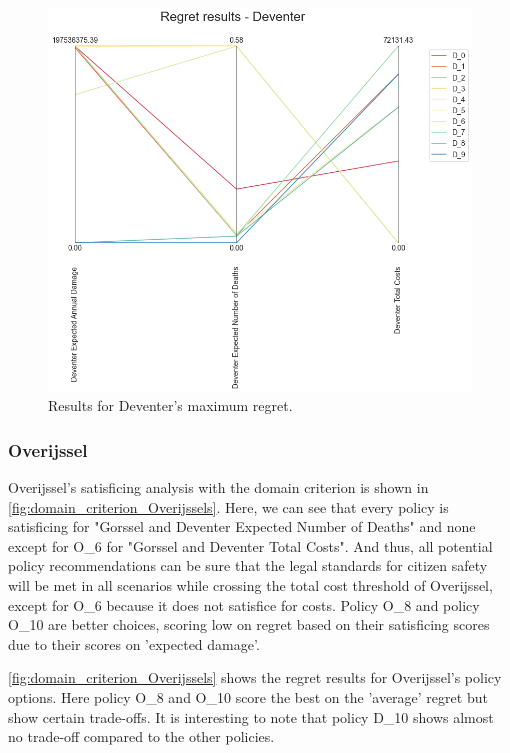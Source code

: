 \begin{figure}[H]
\begin{minipage}[b]{0.4\textwidth}
    \includegraphics[width=1.2\textwidth]{report/figures/results/regret_figure_Deventer.png}
    \caption{Results for Deventer's maximum regret.}
    \label{fig:regret_Deventers}
  \end{minipage}
\end{figure}

\subsubsection{Overijssel}
Overijssel's satisficing analysis with the domain criterion is shown in \autoref{fig:domain_criterion_Overijssels}. Here, we can see that every policy is satisficing for "Gorssel and Deventer Expected Number of Deaths" and none except for O\_6 for "Gorssel and Deventer Total Costs". And thus, all potential policy recommendations can be sure that the legal standards for citizen safety will be met in all scenarios while crossing the total cost threshold of Overijssel, except for O\_6 because it does not satisfice for costs. 
Policy O\_8 and policy O\_10 are better choices, scoring low on regret based on their satisficing scores due to their scores on 'expected damage'. \newline

\noindent \autoref{fig:domain_criterion_Overijssels} shows the regret results for Overijssel's policy options. Here policy O\_8 and O\_10 score the best on the 'average' regret but show certain trade-offs. It is interesting to note that policy D\_10 shows almost no trade-off compared to the other policies.


